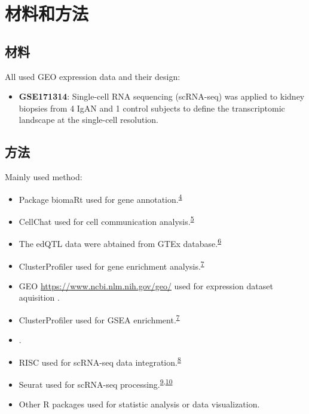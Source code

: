 \documentclass[
]{article}
\providecommand{\tightlist}{%
  \setlength{\itemsep}{0pt}\setlength{\parskip}{0pt}}
\begin{document}
\hypertarget{methods}{%
\section{材料和方法}\label{methods}}

\hypertarget{ux6750ux6599}{%
\subsection{材料}\label{ux6750ux6599}}

All used GEO expression data and their design:

\begin{itemize}
\tightlist
\item
  \textbf{GSE171314}: Single-cell RNA sequencing (scRNA-seq) was applied to kidney biopsies from 4 IgAN and 1 control subjects to define the transcriptomic landscape at the single-cell resolution.
\end{itemize}

\hypertarget{ux65b9ux6cd5}{%
\subsection{方法}\label{ux65b9ux6cd5}}

Mainly used method:

\begin{itemize}
\tightlist
\item
  Package biomaRt used for gene annotation.\textsuperscript{\protect\hyperlink{ref-MappingIdentifDurinc2009}{4}}
\item
  CellChat used for cell communication analysis.\textsuperscript{\protect\hyperlink{ref-InferenceAndAJinS2021}{5}}
\item
  The edQTL data were abtained from GTEx database.\textsuperscript{\protect\hyperlink{ref-TheGtexConsorNone2020}{6}}
\item
  ClusterProfiler used for gene enrichment analysis.\textsuperscript{\protect\hyperlink{ref-ClusterprofilerWuTi2021}{7}}
\item
  GEO \url{https://www.ncbi.nlm.nih.gov/geo/} used for expression dataset aquisition .
\item
  ClusterProfiler used for GSEA enrichment.\textsuperscript{\protect\hyperlink{ref-ClusterprofilerWuTi2021}{7}}
\item
  .
\item
  RISC used for scRNA-seq data integration.\textsuperscript{\protect\hyperlink{ref-RobustIntegratLiuY2021}{8}}
\item
  Seurat used for scRNA-seq processing.\textsuperscript{\protect\hyperlink{ref-IntegratedAnalHaoY2021}{9},\protect\hyperlink{ref-ComprehensiveIStuart2019}{10}}
\item
  Other R packages used for statistic analysis or data visualization.
\end{itemize}
\end{document}
